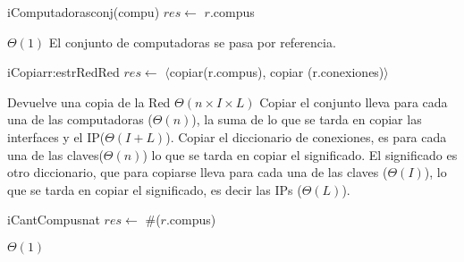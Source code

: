 \begin{Algoritmos}
  \nuevoAlgo
  \begin{algoritmo}{iComputadoras}{}{conj(compu)}{}
    $res \gets$ $r$.compus 
  \end{algoritmo}
  \datosAlgoritmo{} %
  {} %
  {} %
  {$\Theta(1)$} %
  {El conjunto de computadoras se pasa por referencia.} %
   
  \nuevoAlgo 
  \begin{algoritmo}{iCopiar}{\In r:estrRed}{Red}
   	$res \gets$ $\langle$copiar(r.compus), copiar (r.conexiones)$\rangle$
  \end{algoritmo}
  \datosAlgoritmo
  {Devuelve una copia de la Red} %
  {} %
  {} %
  {$\Theta(n \times I \times L)$} %
  {Copiar el conjunto lleva para cada una de las computadoras ($\Theta(n)$), la suma de lo que se tarda en copiar las interfaces y el IP($\Theta(I + L)$). Copiar el diccionario de conexiones, es para cada una de las claves($\Theta(n)$) lo que se tarda en copiar el significado. El significado es otro diccionario, que para copiarse lleva para cada una de las claves ($\Theta(I)$), lo que se tarda en copiar el significado, es decir las IPs ($\Theta(L)$). } %

  \nuevoAlgo
  \begin{algoritmo}{iCantCompus}{}{nat}
    $res \gets$ $\#$($r$.compus) 
  \end{algoritmo}   
  \datosAlgoritmo{} %
  {} %
  {} %
  {$\Theta(1)$} %
  {} %

\end{Algoritmos}
